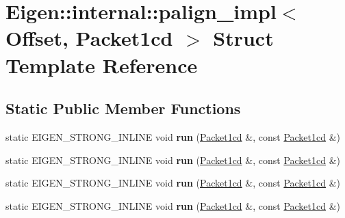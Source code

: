 \hypertarget{struct_eigen_1_1internal_1_1palign__impl_3_01_offset_00_01_packet1cd_01_4}{}\section{Eigen\+:\+:internal\+:\+:palign\+\_\+impl$<$ Offset, Packet1cd $>$ Struct Template Reference}
\label{struct_eigen_1_1internal_1_1palign__impl_3_01_offset_00_01_packet1cd_01_4}
\subsection*{Static Public Member Functions}
\begin{DoxyCompactItemize}
\item 
\mbox{\label{struct_eigen_1_1internal_1_1palign__impl_3_01_offset_00_01_packet1cd_01_4_ac1744967710606c722b358f1b2349acd}} 
static E\+I\+G\+E\+N\+\_\+\+S\+T\+R\+O\+N\+G\+\_\+\+I\+N\+L\+I\+NE void {\bfseries run} (\hyperlink{struct_eigen_1_1internal_1_1_packet1cd}{Packet1cd} \&, const \hyperlink{struct_eigen_1_1internal_1_1_packet1cd}{Packet1cd} \&)
\item 
\mbox{\label{struct_eigen_1_1internal_1_1palign__impl_3_01_offset_00_01_packet1cd_01_4_ac1744967710606c722b358f1b2349acd}} 
static E\+I\+G\+E\+N\+\_\+\+S\+T\+R\+O\+N\+G\+\_\+\+I\+N\+L\+I\+NE void {\bfseries run} (\hyperlink{struct_eigen_1_1internal_1_1_packet1cd}{Packet1cd} \&, const \hyperlink{struct_eigen_1_1internal_1_1_packet1cd}{Packet1cd} \&)
\item 
\mbox{\label{struct_eigen_1_1internal_1_1palign__impl_3_01_offset_00_01_packet1cd_01_4_ac1744967710606c722b358f1b2349acd}} 
static E\+I\+G\+E\+N\+\_\+\+S\+T\+R\+O\+N\+G\+\_\+\+I\+N\+L\+I\+NE void {\bfseries run} (\hyperlink{struct_eigen_1_1internal_1_1_packet1cd}{Packet1cd} \&, const \hyperlink{struct_eigen_1_1internal_1_1_packet1cd}{Packet1cd} \&)
\item 
\mbox{\label{struct_eigen_1_1internal_1_1palign__impl_3_01_offset_00_01_packet1cd_01_4_ac1744967710606c722b358f1b2349acd}} 
static E\+I\+G\+E\+N\+\_\+\+S\+T\+R\+O\+N\+G\+\_\+\+I\+N\+L\+I\+NE void {\bfseries run} (\hyperlink{struct_eigen_1_1internal_1_1_packet1cd}{Packet1cd} \&, const \hyperlink{struct_eigen_1_1internal_1_1_packet1cd}{Packet1cd} \&)
\end{DoxyCompactItemize}


